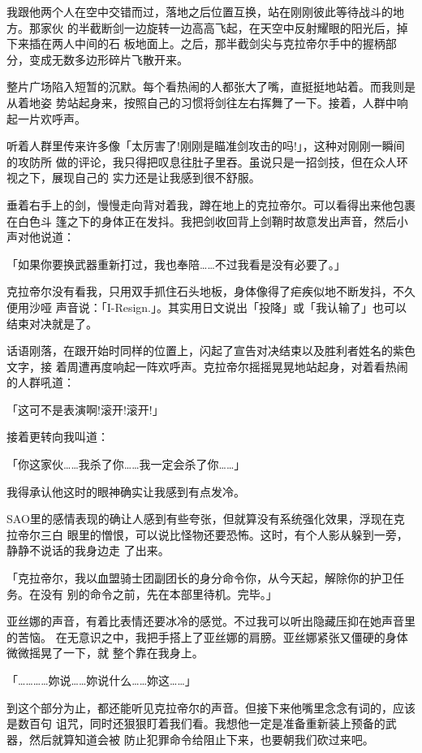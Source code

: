 \documentclass[11pt]{book}
\begin{document}
我跟他两个人在空中交错而过，落地之后位置互换，站在刚刚彼此等待战斗的地方。那家伙
的半截断剑一边旋转一边高高飞起，在天空中反射耀眼的阳光后，掉下来插在两人中间的石
板地面上。之后，那半截剑尖与克拉帝尔手中的握柄部分，变成无数多边形碎片飞散开来。







整片广场陷入短暂的沉默。每个看热闹的人都张大了嘴，直挺挺地站着。而我则是从着地姿
势站起身来，按照自己的习惯将剑往左右挥舞了一下。接着，人群中响起一片欢呼声。

听着人群里传来许多像「太厉害了!刚刚是瞄准剑攻击的吗!」，这种对刚刚一瞬间的攻防所
做的评论，我只得把叹息往肚子里吞。虽说只是一招剑技，但在众人环视之下，展现自己的
实力还是让我感到很不舒服。

垂着右手上的剑，慢慢走向背对着我，蹲在地上的克拉帝尔。可以看得出来他包裹在白色斗
篷之下的身体正在发抖。我把剑收回背上剑鞘时故意发出声音，然后小声对他说道：

「如果你要换武器重新打过，我也奉陪……不过我看是没有必要了。」

克拉帝尔没有看我，只用双手抓住石头地板，身体像得了疟疾似地不断发抖，不久便用沙哑
声音说：「I-Resign.」。其实用日文说出「投降」或「我认输了」也可以结束对决就是了。

话语刚落，在跟开始时同样的位置上，闪起了宣告对决结束以及胜利者姓名的紫色文字，接
着周遭再度响起一阵欢呼声。克拉帝尔摇摇晃晃地站起身，对着看热闹的人群吼道：

「这可不是表演啊!滚开!滚开!」

接着更转向我叫道：

「你这家伙……我杀了你……我一定会杀了你……」

我得承认他这时的眼神确实让我感到有点发冷。

SAO里的感情表现的确让人感到有些夸张，但就算没有系统强化效果，浮现在克拉帝尔三白
眼里的憎恨，可以说比怪物还要恐怖。这时，有个人影从躲到一旁，静静不说话的我身边走
了出来。

「克拉帝尔，我以血盟骑士团副团长的身分命令你，从今天起，解除你的护卫任务。在没有
别的命令之前，先在本部里待机。完毕。」

亚丝娜的声音，有着比表情还要冰冷的感觉。不过我可以听出隐藏压抑在她声音里的苦恼。
在无意识之中，我把手搭上了亚丝娜的肩膀。亚丝娜紧张又僵硬的身体微微摇晃了一下，就
整个靠在我身上。

「…………妳说……妳说什么……妳这……」

到这个部分为止，都还能听见克拉帝尔的声音。但接下来他嘴里念念有词的，应该是数百句
诅咒，同时还狠狠盯着我们看。我想他一定是准备重新装上预备的武器，然后就算知道会被
防止犯罪命令给阻止下来，也要朝我们砍过来吧。
\end{document}
